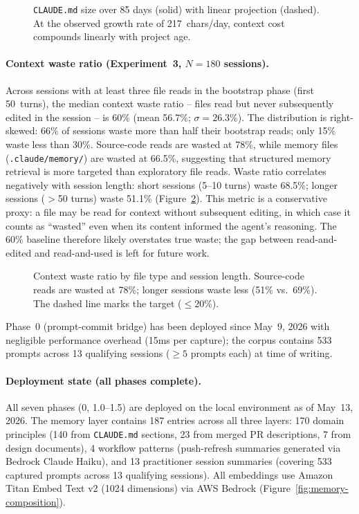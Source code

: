 \documentclass[11pt]{article}
\begin{document}
\begin{figure}[t]
\centering

\caption{\texttt{CLAUDE.md} size over 85 days (solid) with linear projection (dashed). At the observed growth rate of 217~chars/day, context cost compounds linearly with project age.}
\label{fig:claudemd-growth}
\end{figure}

\paragraph{Context waste ratio (Experiment~3, $N{=}180$ sessions).}
Across sessions with at least three file reads in the bootstrap phase (first 50~turns), the median context waste ratio -- files read but never subsequently edited in the session -- is 60\% (mean 56.7\%; $\sigma{=}26.3\%$).
The distribution is right-skewed: 66\% of sessions waste more than half their bootstrap reads; only 15\% waste less than 30\%.
Source-code reads are wasted at 78\%, while memory files (\texttt{.claude/memory/}) are wasted at 66.5\%, suggesting that structured memory retrieval is more targeted than exploratory file reads.
Waste ratio correlates negatively with session length: short sessions (5--10 turns) waste 68.5\%; longer sessions ($>$50 turns) waste 51.1\% (Figure~\ref{fig:waste-breakdown}).
This metric is a conservative proxy: a file may be read for context without subsequent editing, in which case it counts as ``wasted'' even when its content informed the agent's reasoning. The 60\% baseline therefore likely overstates true waste; the gap between read-and-edited and read-and-used is left for future work.

\begin{figure}[t]
\centering

\caption{Context waste ratio by file type and session length. Source-code reads are wasted at 78\%; longer sessions waste less (51\% vs.\ 69\%). The dashed line marks the target (${\leq}20\%$).}
\label{fig:waste-breakdown}
\end{figure}

Phase~0 (prompt-commit bridge) has been deployed since May~9, 2026 with negligible performance overhead (15ms per capture); the corpus contains 533 prompts across 13 qualifying sessions (${\geq}5$ prompts each) at time of writing.

\paragraph{Deployment state (all phases complete).}
All seven phases (0, 1.0--1.5) are deployed on the local environment as of May~13, 2026.
The memory layer contains 187 entries across all three layers: 170 domain principles (140 from \texttt{CLAUDE.md} sections, 23 from merged PR descriptions, 7 from design documents), 4 workflow patterns (push-refresh summaries generated via Bedrock Claude Haiku), and 13 practitioner session summaries (covering 533 captured prompts across 13 qualifying sessions).
All embeddings use Amazon Titan Embed Text v2 (1024 dimensions) via AWS Bedrock (Figure~\ref{fig:memory-composition}).
\end{document}

